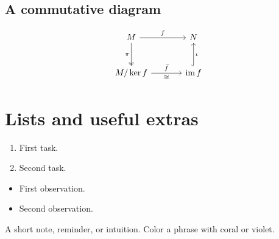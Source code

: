 \documentclass[11pt]{article}
\begin{document}
\subsection{A commutative diagram}
\[
\begin{tikzcd}[row sep=large,column sep=large]
    M \arrow[r,"f"] \arrow[d,two heads,"\pi"'] & N \\
    M/\ker f \arrow[r,"\bar f","\cong"'] & \im f \arrow[u,hook,"\iota"']
\end{tikzcd}
\]

\section{Lists and useful extras}
\begin{enumerate}[label=\alph*)]
    \item First task.
    \item Second task.
\end{enumerate}
\begin{itemize}
    \item First observation.
    \item Second observation.
\end{itemize}

\begin{aside}
A short note, reminder, or intuition. Color a phrase with
\textcolor{cncoral}{coral} or \textcolor{cnviolet}{violet}.
\end{aside}

\end{document}
